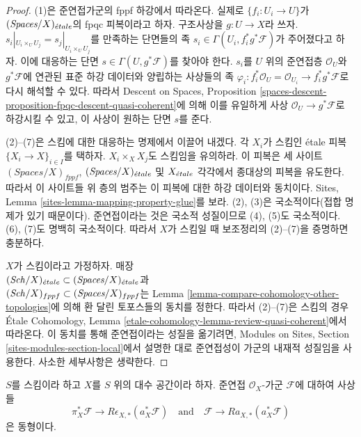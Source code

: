 \begin{proof}
(1)은 준연접가군의 fppf 하강에서 따라온다. 실제로
$\{f_i : U_i \to U\}$가 $(\textit{Spaces}/X)_{\acute{e}tale}$의 fpqc
피복이라고 하자. 구조사상을 $g : U \to X$라 쓰자.
$s_i|_{U_i \times_U U_j} = s_j|_{U_i \times_U U_j}$를 만족하는
단면들의 족 $s_i \in \Gamma(U_i , f_i^*g^*\mathcal{F})$가
주어졌다고 하자.
이에 대응하는 단면 $s \in \Gamma(U, g^*\mathcal{F})$를 찾아야 한다.
$s_i$를 $U$ 위의 준연접층 $\mathcal{O}_U$와 $g^*\mathcal{F}$에 연관된 표준
하강 데이터와 양립하는 사상들의 족
$\varphi_i : f_i^*\mathcal{O}_U = \mathcal{O}_{U_i} \to f_i^*g^*\mathcal{F}$로
다시 해석할 수 있다. 따라서 Descent on Spaces, Proposition
\ref{spaces-descent-proposition-fpqc-descent-quasi-coherent}에 의해 이를
유일하게 사상 $\mathcal{O}_U \to g^*\mathcal{F}$로 하강시킬 수 있고,
이 사상이 원하는 단면 $s$를 준다.

\medskip\noindent
(2)--(7)은 스킴에 대한 대응하는 명제에서 이끌어 내겠다.
각 $X_i$가 스킴인 \'etale 피복
$\{X_i \to X\}_{i \in I}$를 택하자. $X_i \times_X X_j$도 스킴임을
유의하라. 이 피복은 세 사이트
$(\textit{Spaces}/X)_{fppf}$, $(\textit{Spaces}/X)_{\acute{e}tale}$ 및 $X_{\acute{e}tale}$
각각에서 종대상의 피복을 유도한다. 따라서 이 사이트들 위 층의
범주는 이 피복에 대한 하강 데이터와 동치이다. Sites, Lemma
\ref{sites-lemma-mapping-property-glue}를 보라.
(2), (3)은 국소적이다(접합 명제가 있기 때문이다).
준연접이라는 것은 국소적 성질이므로 (4), (5)도 국소적이다.
(6), (7)도 명백히 국소적이다. 따라서 $X$가 스킴일 때 보조정리의
(2)--(7)을 증명하면 충분하다.

\medskip\noindent
$X$가 스킴이라고 가정하자. 매장\\
$(\mathit{Sch}/X)_{\acute{e}tale} \subset (\textit{Spaces}/X)_{\acute{e}tale}$과\\
$(\mathit{Sch}/X)_{fppf} \subset (\textit{Spaces}/X)_{fppf}$는 Lemma
\ref{lemma-compare-cohomology-other-topologies}에 의해 환 달린
토포스들의 동치를 정한다. 따라서 (2)--(7)은 스킴의 경우
\'Etale Cohomology, Lemma
\ref{etale-cohomology-lemma-review-quasi-coherent}에서 따라온다.
이 동치를 통해 준연접이라는 성질을 옮기려면, Modules on Sites,
Section \ref{sites-modules-section-local}에서 설명한 대로 준연접성이
가군의 내재적 성질임을 사용한다. 사소한 세부사항은 생략한다.
\end{proof}

\begin{lemma}
\label{lemma-cohomological-descent-etale-fppf-modules}
$S$를 스킴이라 하고 $X$를 $S$ 위의 대수 공간이라 하자.
준연접 $\mathcal{O}_X$-가군 $\mathcal{F}$에 대하여 사상들
$$
\pi_X^*\mathcal{F} \longrightarrow R\epsilon_{X, *}(a_X^*\mathcal{F})
\quad\text{and}\quad
\mathcal{F} \longrightarrow Ra_{X, *}(a_X^*\mathcal{F})
$$
은 동형이다.
\end{lemma}

